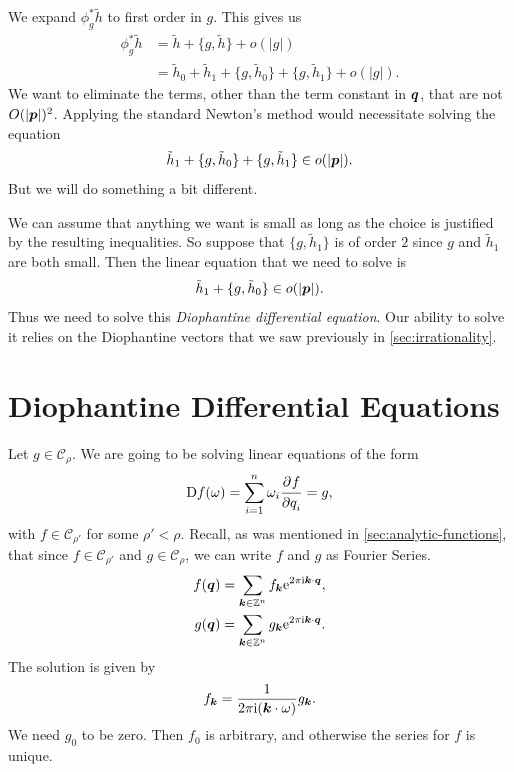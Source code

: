 \documentclass[twoside,letterpaper,10pt]{article}
\numberwithin{equation}{section}
\begin{document}
We expand $\phi_g^* \tilde{h}$ to first order in $g$.
This gives us
\begin{align*}
  \phi_g^* \tilde{h} &= \tilde{h} + \{g, \tilde{h}\} + o(|g|)\\
                     &= \tilde{h}_0 + \tilde{h}_1 + \{g, \tilde{h}_0\} + \{g,
                       \tilde{h}_1\} + o(|g|).
\end{align*}
We want to eliminate the terms, other than the term constant in $\bm{q}$, that
are not $O(|\bm{p}|)^2$.
Applying the standard Newton's method would necessitate solving the equation
\begin{equation*}
  \tilde{h}_1 + \{g, \tilde{h}_0\} + \{g, \tilde{h}_1\} \in o(|\bm{p}|).
\end{equation*}
But we will do something a bit different.

We can assume that anything we want is small as long as the choice is justified
by the resulting inequalities.
So suppose that $\{g, \tilde{h}_1\}$ is of order $2$ since $g$ and $\tilde{h}_1$
are both small.
Then the linear equation that we need to solve is
\begin{equation*}
  \tilde{h}_1 + \{g, \tilde{h}_0\} \in o(|\bm{p}|).
\end{equation*}
Thus we need to solve this \emph{Diophantine differential equation}.
Our ability to solve it relies on the Diophantine vectors that we saw previously
in \cref{sec:irrationality}.

\section{Diophantine Differential Equations}
\label{sec:dioph-diff-equat}

Let $g \in \mathcal{C}_{\rho}$.
We are going to be solving linear equations of the form
\begin{equation*}
  \mathop{}\!\mathrm{D} f(\omega) = \sum_{i = 1}^n \omega_i \frac{\strut\partial^{}f}{\strut\partial q_i^{}} = g,
\end{equation*}
with $f \in \mathcal{C}_{\rho'}$ for some $\rho' < \rho$.
Recall, as was mentioned in \cref{sec:analytic-functions}, that since $f \in
\mathcal{C}_{\rho'}$ and $g \in \mathcal{C}_{\rho}$, we can write $f$ and $g$ as
Fourier Series.
\begin{align*}
  f(\bm{q}) &= \sum_{\bm{k} \in \mathbb{Z}^n} f_{\bm{k}} \mathrm{e}^{2 \pi \mathrm{i} \bm{k} \cdot
    \bm{q}},\\
  g(\bm{q}) &= \sum_{\bm{k} \in \mathbb{Z}^n} g_{\bm{k}} \mathrm{e}^{2 \pi \mathrm{i} \bm{k} \cdot \bm{q}}.
\end{align*}
The solution is given by
\begin{equation}
  \label{eq:dio-sol}
  f_{\bm{k}} = \frac{1}{2 \pi \mathrm{i} (\bm{k} \cdot \omega)}g_{\bm{k}}.
\end{equation}
We need $g_0$ to be zero.
Then $f_0$ is arbitrary, and otherwise the series for $f$ is unique.
\end{document}
